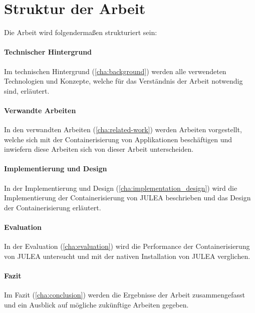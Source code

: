 \section{Struktur der Arbeit}

Die Arbeit wird folgendermaßen strukturiert sein:

\paragraph{Technischer Hintergrund}

Im technischen Hintergrund (\cref{cha:background}) werden alle verwendeten Technologien und Konzepte, welche für das Verständnis der Arbeit notwendig sind, erläutert.

\paragraph{Verwandte Arbeiten}

In den verwandten Arbeiten (\cref{cha:related-work}) werden Arbeiten vorgestellt, welche sich mit der Containerisierung von Applikationen beschäftigen und inwiefern diese Arbeiten sich von dieser Arbeit unterscheiden.

\paragraph{Implementierung und Design}

In der Implementierung und Design (\cref{cha:implementation_design}) wird die Implementierung der Containerisierung von JULEA beschrieben und das Design der Containerisierung erläutert.

\paragraph{Evaluation}

In der Evaluation (\cref{cha:evaluation}) wird die Performance der Containerisierung von JULEA untersucht und mit der nativen Installation von JULEA verglichen.

\paragraph{Fazit}

Im Fazit (\cref{cha:conclusion}) werden die Ergebnisse der Arbeit zusammengefasst und ein Ausblick auf mögliche zukünftige Arbeiten gegeben.

